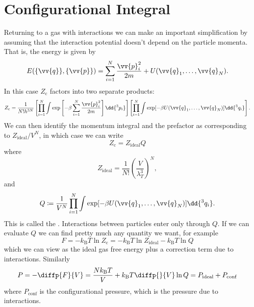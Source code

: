 \documentclass[fleqn]{NotesClass}
\newcommand*{\boltzmann}{k_{\mathrm{B}}}
\newcommand*{\cpartition}{Z_{\mathrm{c}}}
\begin{document}
    \section{Configurational Integral}
    Returning to a gas with interactions we can make an important simplification by assuming that the interaction potential doesn't depend on the particle momenta.
    That is, the energy is given by
    \begin{equation}
        E(\{\vv{q}\}, \{\vv{p}\}) = \sum_{i = 1}^{N} \frac{\vv{p}_i^2}{2m} + U(\vv{q}_1, \dotsc, \vv{q}_N).
    \end{equation}
    In this case \(\cpartition\) factors into two separate products:
    \begin{equation*}
        \cpartition = \frac{1}{N!h^{3N}} \left[ \prod_{i = 1}^{N} \int \exp\left[ -\beta\sum_{i=1}^{N} \frac{\vv{p}_i^2}{2m} \right] \dd{^3 p_i} \right] \left[ \prod_{i=1}^{N} \int \exp[ -\beta U(\vv{q}_1, \dotsc, \vv{q}_N) ] \dd{^3q_i} \right].
    \end{equation*}
    We can then identify the momentum integral and the prefactor as corresponding to \(Z_{\mathrm{ideal}} / V^N\), in which case we can write
    \begin{equation}
        \cpartition = Z_{\mathrm{ideal}} Q
    \end{equation}
    where
    \begin{equation}
        Z_{\mathrm{ideal}} = \frac{1}{N!} \left( \frac{V}{\lambda_T^3} \right)^N,
    \end{equation}
    and
    \begin{equation}
        Q \coloneqq \frac{1}{V^N} \prod_{i = 1}^{N} \int \exp[-\beta U(\vv{q}_1, \dotsc, \vv{q}_N)] \dd{^3q_i}.
    \end{equation}
    This is called the .
    Interactions between particles enter only through \(Q\).
    If we can evaluate \(Q\) we can find pretty much any quantity we want, for example
    \begin{equation}
        F = -\boltzmann T \ln \cpartition = -\boltzmann T \ln Z_{\mathrm{ideal}} - \boltzmann T \ln Q
    \end{equation}
    which we can view as the ideal gas free energy plus a correction term due to interactions.
    Similarly
    \begin{equation}
        P = - \diffp{F}{V} = \frac{N\boltzmann T}{V} + \boltzmann T \diffp{}{V} \ln Q = P_{\mathrm{ideal}} + P_{\mathrm{conf}}
    \end{equation}
    where \(P_{\mathrm{conf}}\) is the configurational pressure, which is the pressure due to interactions.
    
\end{document}
